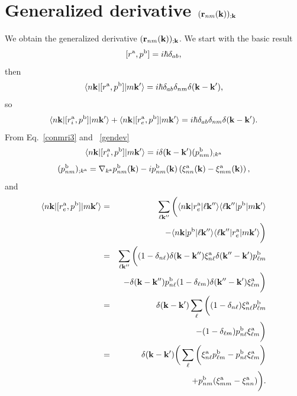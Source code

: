 \documentclass[floatfix,prb,aps,superscriptaddress,11pt,preprint]{revtex4}
\begin{document}
\section{Generalized derivative $(\mathbf{r}_{nm}(\mathbf{k}))_{;\mathbf{k}}$}\label{gder}

We obtain the generalized derivative $(\mathbf{r}_{nm}(\mathbf{k}))_{;\mathbf{k}}$.
We start with the basic result
\begin{equation}\label{a_hrdab}
[r^{\mathrm{a}},p^{\mathrm{b}}]=i\hbar\delta_{ab}
,
\end{equation} 
then
\begin{equation}\label{a_hrdab2}
\langle n\mathbf{k} |[r^{\mathrm{a}},p^{\mathrm{b}}]| m\mathbf{k}' \rangle=i\hbar\delta_{ab}\delta_{nm}\delta(\mathbf{k}-\mathbf{k}')
,
\end{equation}
so
\begin{equation}\label{a_hrdab3}
\langle n\mathbf{k} |[r^{\mathrm{a}}_i,p^{\mathrm{b}}]| m\mathbf{k}' \rangle
+
\langle n\mathbf{k} |[r^{\mathrm{a}}_e,p^{\mathrm{b}}]| m\mathbf{k}' \rangle
=i\hbar\delta_{ab}\delta_{nm}\delta(\mathbf{k}-\mathbf{k}')
.
\end{equation}
From Eq.~\eqref{conmri3} and ~\eqref{gendev}
\begin{equation}\label{a_rip}
\langle n\mathbf{k} |[r^{\mathrm{a}}_i,p^{\mathrm{b}}]| m\mathbf{k}' \rangle
=i\delta(\mathbf{k}-\mathbf{k}')(p^{\mathrm{b}}_{nm})_{;k^{\mathrm{a}}}
\end{equation}
\begin{equation}\label{a_ripn}
(p^{\mathrm{b}}_{nm})_{;k^{\mathrm{a}}}=
\nabla_{k^{\mathrm{a}}}
p^{\mathrm{b}}_{n m}(\mathbf{k})
-
i
p^{\mathrm{b}}_{nm}(\mathbf{k})
\left(
\xi^{\mathrm{a}}_{nn}(\mathbf{k})
-
\xi^{\mathrm{a}}_{mm}(\mathbf{k})
\right)
,
\end{equation}
and
\begin{eqnarray}\label{a_rep}
\langle n\mathbf{k} |[r^{\mathrm{a}}_e,p^{\mathrm{b}}]| m\mathbf{k}' \rangle&=&
\sum_{\ell\mathbf{k}''}
\bigg(
\langle n\mathbf{k} |r^{\mathrm{a}}_e| \ell\mathbf{k}'' \rangle\langle \ell\mathbf{k}'' |p^{\mathrm{b}}| m\mathbf{k}' \rangle
\nonumber \\
&&
-
\langle n\mathbf{k} |p^{\mathrm{b}}| \ell\mathbf{k}'' \rangle\langle \ell\mathbf{k}'' |r^{\mathrm{a}}_e| m\mathbf{k}' \rangle
\bigg)
\nonumber \\
&=&
\sum_{\ell\mathbf{k}''}
\bigg(
(1-\delta_{n\ell})\delta(\mathbf{k}-\mathbf{k}'')\xi^{\mathrm{a}}_{n\ell}
\delta(\mathbf{k}''-\mathbf{k}')p^{\mathrm{b}}_{\ell m}
\nonumber \\
&&-
\delta(\mathbf{k}-\mathbf{k}'')p^{\mathrm{b}}_{n\ell}
(1-\delta_{\ell m})\delta(\mathbf{k}''-\mathbf{k}')\xi^{\mathrm{a}}_{\ell m}
\bigg)
\nonumber \\
&=&
\delta(\mathbf{k}-\mathbf{k}')
\sum_{\ell}
\bigg(
(1-\delta_{n\ell})
\xi^{\mathrm{a}}_{n\ell}
p^{\mathrm{b}}_{\ell m}
\nonumber \\
&&-
(1-\delta_{\ell m})
p^{\mathrm{b}}_{n\ell}
\xi^{\mathrm{a}}_{\ell m}
\bigg)
\nonumber \\
&=&
\delta(\mathbf{k}-\mathbf{k}')
\bigg(
\sum_{\ell}
\bigg(
\xi^{\mathrm{a}}_{n\ell}
p^{\mathrm{b}}_{\ell m}
-
p^{\mathrm{b}}_{n\ell}
\xi^{\mathrm{a}}_{\ell m}
\bigg)
\nonumber \\
&&+
p^{\mathrm{b}}_{nm}(\xi^{\mathrm{a}}_{mm}
-
\xi^{\mathrm{a}}_{nn}
)
\bigg)
.
\end{eqnarray}
\end{document}
